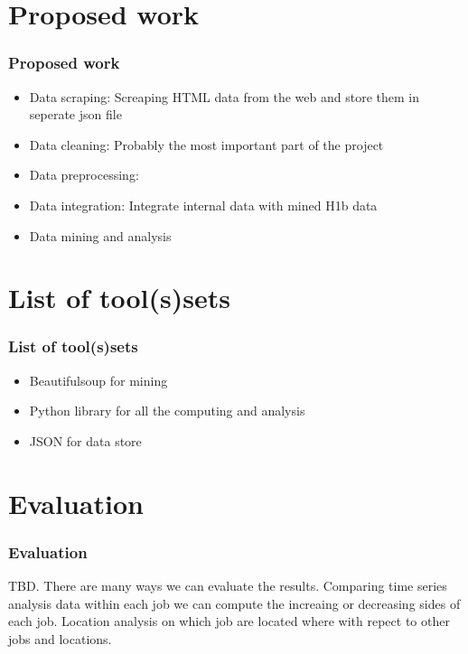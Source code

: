 \documentclass[10pt,mathserif]{beamer}
\begin{document}
	\section{Proposed work}
\begin{frame}
	\frametitle{Proposed work}
\begin{itemize}
	\item Data scraping: Screaping HTML data from the web and store them in seperate json file
	\item Data cleaning: Probably the most important part of the project
	\item Data preprocessing: 
\item Data integration: Integrate internal data with mined H1b data 
\item Data mining and analysis
\end{itemize}
\end{frame}

	\section{List of tool(s)sets}
\begin{frame}
	\frametitle{List of tool(s)sets}
	\begin{itemize}
		\item Beautifulsoup for mining
		\item Python library for all the computing and analysis
		\item JSON for data store
	\end{itemize}
\end{frame}

	\section{Evaluation}
\begin{frame}
	\frametitle{Evaluation}
	TBD. There are many ways we can evaluate the results. Comparing  time series analysis data within each job we can compute the increaing or decreasing sides of each job. Location analysis on which job are located where with repect to other jobs and locations. 
\end{frame}
	
\end{document}
